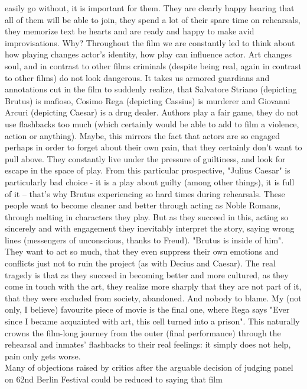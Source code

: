 \documentclass[10pt]{article}
\begin{document}
easily go without, it is important for them. They are clearly happy hearing that all of them will be able to join, they spend a lot of their spare
time on rehearsals, they memorize text be hearts and are ready and happy to make avid improvisations. Why? Throughout the film we are constantly
led to think about how playing changes actor's identity, how play can influence actor. Art changes soul, and in contrast to other films criminals
(despite being real, again in contrast to other films) do not look dangerous. It takes us armored guardians and 
annotations cut in the film to suddenly realize, that
Salvatore Striano (depicting Brutus) is mafioso, Cosimo Rega (depicting Cassius) is murderer and Giovanni Arcuri (depicting Caesar)
is a drug dealer. Authors play a fair game, they do not use flashbacks too much (which certainly would be able to add to film a violence,
action or anything). Maybe, this mirrors the fact that actors are so engaged perhaps in order to forget about their own pain, that they certainly
don't want to pull above. They constantly live under the pressure of guiltiness, and look for escape in the space of play. From this particular
prospective, "Julius Caesar" is particularly bad choice - it is a play about guilty (among other things), it is full of it -- that's why Brutus
experiencing so hard times during rehearsals. These people want to become cleaner and better through acting as Noble Romans, through melting
in characters they play. But as they succeed in this, acting so sincerely and with engagement they inevitably interpret the story, saying
wrong lines (messengers of unconscious, thanks to Freud). "Brutus is inside of him". They want to act so much, that they even suppress their
own emotions and conflicts just not to ruin the project (as with Decius and Caesar). The real tragedy is that as they succeed in becoming
better and more cultured, as they come in touch with the art, they realize more sharply that they are not part of it, that they were excluded
from society, abandoned. And nobody to blame. My (not only, I believe) favourite piece of movie is the final one, where Rega says
"Ever since I became acquainted with art, this cell turned into a prison". This naturally crowns the film-long journey from the outer (final
performance) through the rehearsal and inmates' flashbacks to their real feelings: it simply does not help, pain only gets worse.\\
Many of objections raised by critics after the arguable decision of judging panel on 62nd Berlin Festival could be reduced to saying that film
\end{document}
